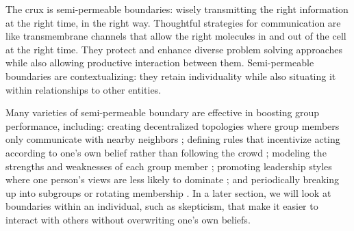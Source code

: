 \documentclass[12pt]{article}
\begin{document}
The crux is semi-permeable boundaries: wisely transmitting the right information at the right time, in the right way. Thoughtful strategies for communication are like transmembrane channels that allow the right molecules in and out of the cell at the right time. They protect and enhance diverse problem solving approaches while also allowing productive interaction between them. Semi-permeable boundaries are contextualizing: they retain individuality while also situating it within relationships to other entities. 

Many varieties of semi-permeable boundary are effective in boosting group performance, including: creating decentralized topologies where group members only communicate with nearby neighbors \citep{becker2017network, mason2008propagation}; defining rules that incentivize acting according to one's own belief rather than following the crowd \citep{hung2001information, bazazi2019self}; modeling the strengths and weaknesses of each group member \citep{welinder2010multidimensional}; promoting leadership styles where one person's views are less likely to dominate \citep{flowers1977laboratory, leana1985partial}; and periodically breaking up into subgroups or rotating membership \citep{janis1972victims, hauer2021science, trainer2020team, straus2011group, feldman1994whos, sutton1987selecting, kane2005knowledge, wu2022membership, owen2019avoid, vafeas2003length, bebchuk2005costs, baron2005so}. In a later section, we will look at boundaries within an individual, such as skepticism, that make it easier to interact with others without overwriting one's own beliefs.


\end{document}
